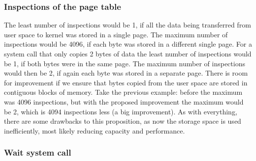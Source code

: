 \documentclass{article}
\renewcommand{\_}{\char`_}
\begin{document}
\subsubsection{Inspections of the page table}
The least number of inspections would be 1, if all the data being transferred from user space to kernel was stored in a single page. The maximum number of inspections would be 4096, if each byte was stored in a different single page.  For a system call that only copies 2 bytes of data the least number of inspections would be 1, if both bytes were in the same page. The maximum number of inspections would then be 2, if again each byte was stored in a separate page. There is room for improvement if we ensure that bytes copied from the user space are stored in contiguous blocks of memory. Take the previous example: before the maximum was 4096 inspections, but with the proposed improvement the maximum would be 2, which is 4094 inspections less (a big improvement). As with everything, there are some drawbacks to this proposition, as now the storage space is used inefficiently, most likely reducing capacity and performance.

\subsubsection{Wait system call}
\end{document}

